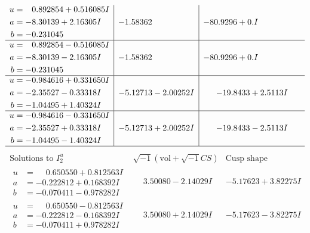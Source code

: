 \documentclass[1p]{elsarticle_modified}
\theoremstyle{definition}
\newcommand{\I}{\sqrt{-1}}
\begin{document}
$$\begin{array}{c|c|c}
\begin{aligned}
u &= \phantom{-}0.892854 + 0.516085 I \\
a &= -8.30139 + 2.16305 I \\
b &= -0.231045\phantom{ +0.000000I}\end{aligned}
 & -1.58362\phantom{ +0.000000I} & -80.9296 + 0. I\phantom{ +0.000000I} \\ \hline\begin{aligned}
u &= \phantom{-}0.892854 - 0.516085 I \\
a &= -8.30139 - 2.16305 I \\
b &= -0.231045\phantom{ +0.000000I}\end{aligned}
 & -1.58362\phantom{ +0.000000I} & -80.9296 + 0. I\phantom{ +0.000000I} \\ \hline\begin{aligned}
u &= -0.984616 + 0.331650 I \\
a &= -2.35527 - 0.33318 I \\
b &= -1.04495 + 1.40324 I\end{aligned}
 & -5.12713 - 2.00252 I & -19.8433 + 2.5113 I \\ \hline\begin{aligned}
u &= -0.984616 - 0.331650 I \\
a &= -2.35527 + 0.33318 I \\
b &= -1.04495 - 1.40324 I\end{aligned}
 & -5.12713 + 2.00252 I & -19.8433 - 2.5113 I\\
 \hline 
 \end{array}$$\newpage$$\begin{array}{c|c|c}  
\text{Solutions to }I^u_{2}& \I (\text{vol} + \sqrt{-1}CS) & \text{Cusp shape}\\
 \hline 
\begin{aligned}
u &= \phantom{-}0.650550 + 0.812563 I \\
a &= -0.222812 + 0.168392 I \\
b &= -0.070411 - 0.978282 I\end{aligned}
 & \phantom{-}3.50080 - 2.14029 I & -5.17623 + 3.82275 I \\ \hline\begin{aligned}
u &= \phantom{-}0.650550 - 0.812563 I \\
a &= -0.222812 - 0.168392 I \\
b &= -0.070411 + 0.978282 I\end{aligned}
 & \phantom{-}3.50080 + 2.14029 I & -5.17623 - 3.82275 I \\ \hline\begin{aligned}

\end{aligned}
\end{array}$$
\end{document}
